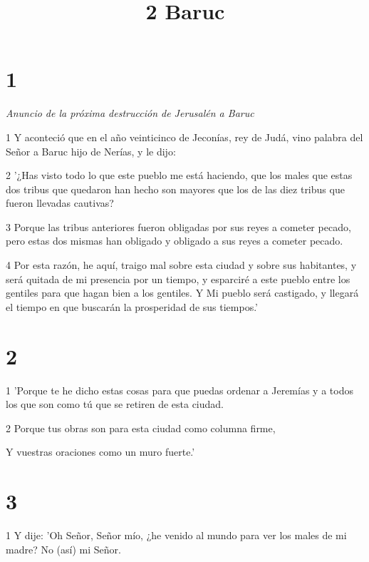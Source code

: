 

\title{2 Baruc}

\chapter{1}

\par \textit{Anuncio de la próxima destrucción de Jerusalén a Baruc}

\par 1 Y aconteció que en el año veinticinco de Jeconías, rey de Judá, vino palabra del Señor a Baruc hijo de Nerías, y le dijo:

\par 2 '¿Has visto todo lo que este pueblo me está haciendo, que los males que estas dos tribus que quedaron han hecho son mayores que los de las diez tribus que fueron llevadas cautivas?

\par 3 Porque las tribus anteriores fueron obligadas por sus reyes a cometer pecado, pero estas dos mismas han obligado y obligado a sus reyes a cometer pecado.

\par 4 Por esta razón, he aquí, traigo mal sobre esta ciudad y sobre sus habitantes, y será quitada de mi presencia por un tiempo, y esparciré a este pueblo entre los gentiles para que hagan bien a los gentiles. Y Mi pueblo será castigado, y llegará el tiempo en que buscarán la prosperidad de sus tiempos.'

\chapter{2}

\par 1 'Porque te he dicho estas cosas para que puedas ordenar a Jeremías y a todos los que son como tú que se retiren de esta ciudad.

\par 2 Porque tus obras son para esta ciudad como columna firme,

\par Y vuestras oraciones como un muro fuerte.'

\chapter{3}

\par 1 Y dije: 'Oh Señor, Señor mío, ¿he venido al mundo para ver los males de mi madre? No (así) mi Señor.

